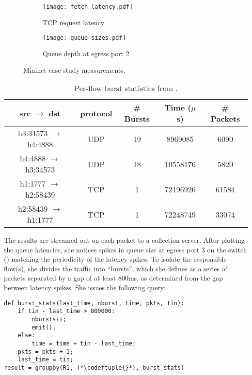 \begin{figure}[!t]
\centering
\vspace{-0.1in}
\begin{subfigure}[t]{0.48\columnwidth}
\raggedright
\texttt{[image: fetch\_latency.pdf]}
\vspace{-0.2in}
\caption{TCP request latency}
\label{fig:mininet-latency}
\end{subfigure}
\begin{subfigure}[t]{0.48\columnwidth}
\raggedleft
\texttt{[image: queue\_sizes.pdf]}
\vspace{-0.2in}
\caption{Queue depth at egress port 2}
\label{fig:mininet-qin}
\end{subfigure}
\vspace{0.05in}
\caption{Mininet case study measurements.}
\end{figure}
\begin{table}[t]
\centering
\small
\begin{tabular}{|c|c|c|c|c|} \hline
\bf{src $\rightarrow$ dst} & \bf{protocol} & \bf{\# Bursts} & \bf{Time ($\mu$s)} & \bf{\# Packets} \\ \hline
h3:34573 $\rightarrow$ h4:4888 & UDP & 19 & 8969085 & 6090 \\
h4:4888 $\rightarrow$ h3:34573 & UDP & 18 & 10558176 & 5820 \\
h1:1777 $\rightarrow$ h2:58439 & TCP & 1 & 72196926 & 61584 \\
h2:58439 $\rightarrow$ h1:1777 & TCP & 1 & 72248749 & 33074 \\ \hline
\end{tabular}
\caption{Per-flow burst statistics from \TheSystem.}
\label{t:mininet-flowstats}
\vspace{-0.1in}
\end{table}

The results are streamed out on each packet to a collection server. After
plotting the queue latencies, she notices spikes in queue size at egress port 3
on the switch () matching the periodicity of the latency
spikes. To isolate the responsible flow(s), she divides the traffic into
``bursts'', which she defines as a series of packets separated by a gap of at
least 800ms, as determined from the gap between latency spikes. She issues the
following \TheSystem query:

\begin{small}
\begin{lstlisting}
def burst_stats(last_time, nburst, time, pkts, tin):
    if tin - last_time > 800000:
        nbursts++;
        emit();
    else:
        time = time + tin - last_time;
    pkts = pkts + 1;
    last_time = tin;
result = groupby(R1, (*\codeftuple{}*), burst_stats)
\end{lstlisting}
\end{small}

